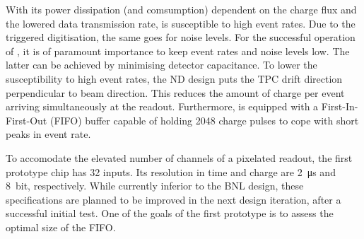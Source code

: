 With its power dissipation (and comsumption) dependent on the charge flux and the lowered data transmission rate, \larpix{} is susceptible to high event rates.
Due to the triggered digitisation, the same goes for noise levels.
For the successful operation of \larpix{}, it is of paramount importance to keep event rates and noise levels low.
The latter can be achieved by minimising detector capacitance.
To lower the susceptibility to high event rates, the \dune{} ND design puts the TPC drift direction perpendicular to beam direction.
This reduces the amount of charge per event arriving simultaneously at the readout.
Furthermore, \larpix{} is equipped with a First-In-First-Out (FIFO) buffer capable of holding \num{2048} charge pulses to cope with short peaks in event rate.

To accomodate the elevated number of channels of a pixelated readout, the first \larpix{} prototype chip has \num{32} inputs.
Its resolution in time and charge are \SI{2}{\micro\second} and \SI{8}{bit}, respectively.
While currently inferior to the BNL design, these specifications are planned to be improved in the next design iteration, after a successful initial test.
One of the goals of the first prototype is to assess the optimal size of the FIFO.~\cite{danLarpix}

\afterpage{\clearpage}